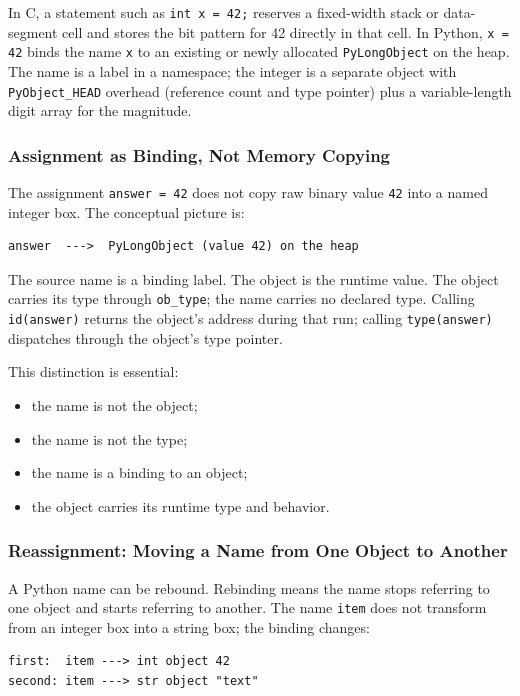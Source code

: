 \documentclass[a4paper,twoside]{report}
\begin{document}
In C, a statement such as \texttt{int x = 42;} reserves a fixed-width stack or data-segment cell and stores the bit pattern for 42 directly in that cell. In Python, \texttt{x = 42} binds the name \texttt{x} to an existing or newly allocated \texttt{PyLongObject} on the heap. The name is a label in a namespace; the integer is a separate object with \texttt{PyObject\_HEAD} overhead (reference count and type pointer) plus a variable-length digit array for the magnitude.

\subsubsection{Assignment as Binding, Not Memory Copying}

The assignment \texttt{answer = 42} does not copy raw binary value \texttt{42} into a named integer box. The conceptual picture is:

\begin{verbatim}
answer  --->  PyLongObject (value 42) on the heap
\end{verbatim}

The source name is a binding label. The object is the runtime value. The object carries its type through \texttt{ob\_type}; the name carries no declared type. Calling \texttt{id(answer)} returns the object's address during that run; calling \texttt{type(answer)} dispatches through the object's type pointer.

This distinction is essential:

\begin{itemize}
    \item the name is not the object;
    \item the name is not the type;
    \item the name is a binding to an object;
    \item the object carries its runtime type and behavior.
\end{itemize}

\subsubsection{Reassignment: Moving a Name from One Object to Another}

A Python name can be rebound. Rebinding means the name stops referring to one object and starts referring to another. The name \texttt{item} does not transform from an integer box into a string box; the binding changes:

\begin{verbatim}
first:  item ---> int object 42
second: item ---> str object "text"
\end{verbatim}
\end{document}
